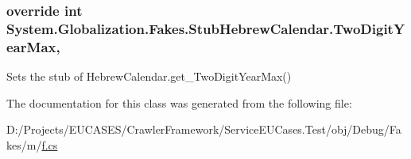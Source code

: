\hypertarget{class_system_1_1_globalization_1_1_fakes_1_1_stub_hebrew_calendar_ad5f9d2b5d302daff8a712ac6a4231d67}{
\subsubsection[{Two\-Digit\-Year\-Max}]{\setlength{\rightskip}{0pt plus 5cm}override int System.\-Globalization.\-Fakes.\-Stub\-Hebrew\-Calendar.\-Two\-Digit\-Year\-Max\hspace{0.3cm}{\ttfamily [get]}, {\ttfamily [set]}}}\label{class_system_1_1_globalization_1_1_fakes_1_1_stub_hebrew_calendar_ad5f9d2b5d302daff8a712ac6a4231d67}


Sets the stub of Hebrew\-Calendar.\-get\-\_\-\-Two\-Digit\-Year\-Max()



The documentation for this class was generated from the following file\-:\begin{DoxyCompactItemize}
\item 
D\-:/\-Projects/\-E\-U\-C\-A\-S\-E\-S/\-Crawler\-Framework/\-Service\-E\-U\-Cases.\-Test/obj/\-Debug/\-Fakes/m/\hyperlink{m_2f_8cs}{f.\-cs}\end{DoxyCompactItemize}
